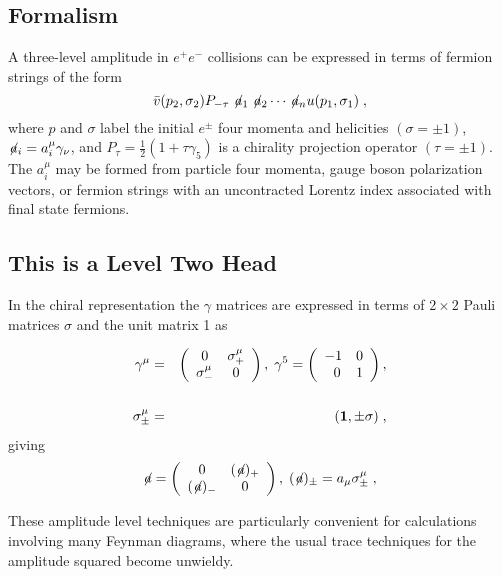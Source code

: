 \subsection{Formalism}
A three-level amplitude in $ e^+e^-$ collisions can be expressed 
in terms of fermion strings of the form 
\begin{equation}
   \bar v(p_2,\sigma_2)P_{-\tau}\not\!a_1\not\!a_2
   \cdots\not\!a_nu(p_1,\sigma_1)\;,
\end{equation}
where $p$ and $\sigma$ label the initial $e^{\pm}$ four momenta and 
helicities $(\sigma = \pm 1)$, $\not\!a_i=a^\mu_i\gamma_\nu$, and 
$P_\tau=\frac{1}{2}(1+\tau\gamma_5)$ is a chirality projection 
operator $(\tau = \pm1)$.  The $a^\mu_i$ may be formed from particle
four momenta, gauge boson polarization vectors, or fermion strings with 
an uncontracted Lorentz index associated with final state fermions.  

\subsection{This is a Level Two Head}
In the chiral representation the $\gamma$ matrices are expressed in 
terms of $2\times 2$ Pauli matrices $\sigma$ and the unit matrix 1 as
\begin{mathletters}
\begin{eqnarray}
   \gamma^\mu & = & \left(\begin{array}{cc} 0 & \sigma^\mu_+ \\
   \sigma^\mu_- & 0 \end{array} \right), \;\gamma^5= \left(
   \begin{array}{cc}
   -1 & 0\\
   \; \; 0 & 1  
   \end{array} \right), \\ & & \nonumber \\
   \sigma^\mu_{\pm} & = & ({\bf 1} ,\pm \sigma)\;, 
\end{eqnarray}
giving 
\begin{eqnarray}
   \not\!a= \left(\begin{array}{cc}0 & (\not\!a)_+\\(\not\!a)_- 
   & 0\end{array}\right), \;(\not\!a)_\pm=a_\mu\sigma^\mu_\pm\;,
\end{eqnarray}
\end{mathletters}
These amplitude level techniques are particularly convenient for 
calculations involving many Feynman diagrams, where the usual 
trace techniques for the amplitude squared become unwieldy.


